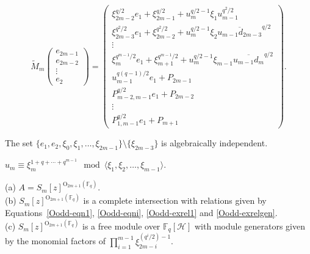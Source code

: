 \documentclass[10pt,a4paper]{amsart}
\newcommand{\field}{\mathbb{F}}
\newcommand{\orth}[2]{{{\text{O}_{{#1}}(\field_{#2})}}}
\renewcommand{\H}{\mathcal{H}}
\begin{document}
\begin{equation}\label{Oodd-matrix-eqn}
\widetilde{M}_m \begin{pmatrix} e_{2m-1}\\ e_{2m-2} \\ \vdots\\ e_2 \end{pmatrix} 
=\begin{pmatrix} \xi_{2m-2}^{q/2}e_1+\xi_{2m-1}^{q/2}+u_m^{q/2-1}\xi_1u_{m-1}^{q^2/2}\\ 
\xi_{2m-3}^{q^2/2}e_1+\xi_{2m-2}^{q^2/2}+u_m^{q/2-1}\xi_2\overline{u_{m-1}d_{2m-3}}^{q/2} \\ 
\vdots\\
\xi_m^{q^{m-1}/2}e_1+\xi_{m+1}^{q^{m-1}/2}+u_m^{q/2-1}\xi_{m-1}\overline{u_{m-1}d_m}^{q/2} \\ 
u_{m-1}^{q(q-1)/2}e_1+P_{2m-1} \\
P^{q/2}_{m-2,m-1} e_1+P_{2m-2}\\
\vdots\\
P_{1,m-1}^{q/2} e_1+P_{m+1}\end{pmatrix}.
\end{equation}

\begin{lemma} \label{Oodd-alg-ind} The set $\{e_1,e_2,\xi_0,\xi_1,\ldots,\xi_{2m-1}\}\setminus\{\xi_{2m-3}\}$ is algebraically independent.
\end{lemma}

\begin{lemma}\label{um-lt-lem} $u_m\equiv \xi_m^{1+q+\cdots+q^{m-1}} \mod{\langle \xi_1,\xi_2,\ldots,\xi_{m-1}\rangle}$.
\end{lemma}

\begin{theorem}\label{main_theorem} (a) $A=S_m[z]^{\orth{2m+1}{q}}$.\\
(b) $S_m[z]^{\orth{2m+1}{q}}$ is a complete intersection with relations given by 
Equations~\ref{Oodd-eqn1}, \ref{Oodd-eqni}, \ref{Oodd-exrel1} and \ref{Oodd-exrelgen}.\\
(c) $S_m[z]^{\orth{2m+1}{q}}$ is a free module over $\field_q[\H]$ with module generators given by the monomial factors of 
$\prod_{i=1}^{m-1} \xi_{2m-i}^{(q^i/2)-1}$.
\end{theorem}
\end{document}
